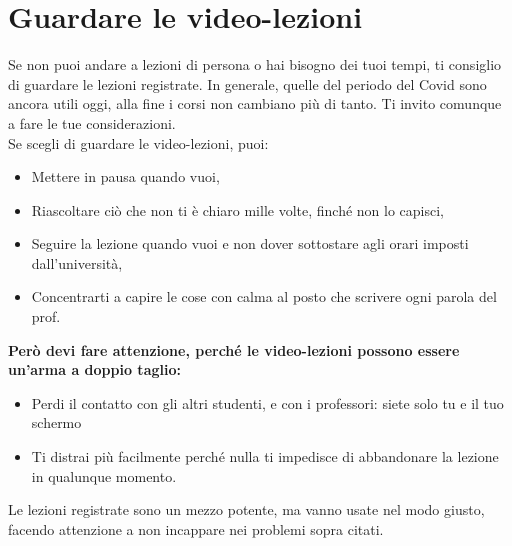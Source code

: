 \documentclass[18pt]{extarticle}
\begin{document}
\section{Guardare le video-lezioni}
Se non puoi andare a lezioni di persona o hai bisogno dei tuoi tempi, ti consiglio di guardare le lezioni registrate. In generale, quelle del periodo del Covid sono ancora utili oggi, alla fine i corsi non cambiano più di tanto. Ti invito comunque a fare le tue considerazioni.\\
Se scegli di guardare le video-lezioni, puoi:
\begin{itemize}
\item Mettere in pausa quando vuoi,
\item Riascoltare ciò che non ti è chiaro mille volte, finché non lo capisci, 
\item Seguire la lezione quando vuoi e non dover sottostare agli orari imposti dall'università, 
\item Concentrarti a capire le cose con calma al posto che scrivere ogni parola del prof. 
\end{itemize}%
\textbf{Però devi fare attenzione, perché le video-lezioni possono essere un'arma a doppio taglio:}
\begin{itemize}
\item Perdi il contatto con gli altri studenti, e con i professori: siete solo tu e il tuo schermo
\item Ti distrai più facilmente perché nulla ti impedisce di abbandonare la lezione in qualunque momento.
\end{itemize}%
Le lezioni registrate sono un mezzo potente, ma vanno usate nel modo giusto, facendo attenzione a non incappare nei problemi sopra citati.
\end{document}

